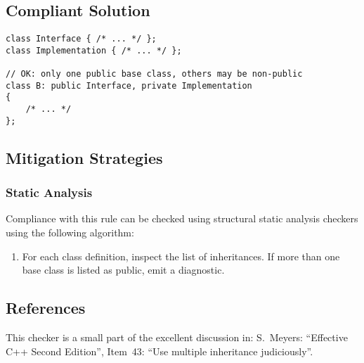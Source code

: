 \subsection{Compliant Solution}

\begin{verbatim}
class Interface { /* ... */ };
class Implementation { /* ... */ };

// OK: only one public base class, others may be non-public
class B: public Interface, private Implementation
{
    /* ... */
};
\end{verbatim}

\subsection{Mitigation Strategies}
\subsubsection{Static Analysis} 

Compliance with this rule can be checked using structural static analysis checkers using the following algorithm:

\begin{enumerate}
\item For each class definition, inspect the list of inheritances. If more
than one base class is listed as public, emit a diagnostic.
\end{enumerate}

\subsection{References}

This checker is a small part of the excellent discussion in: S.~Meyers:
``Effective C++ Second Edition'', Item~43: ``Use multiple inheritance
judiciously''.
